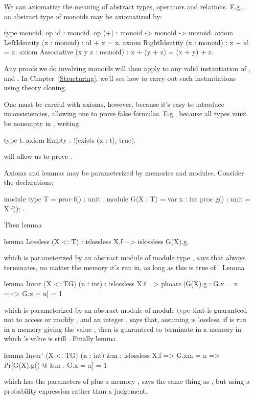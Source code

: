 We can axiomatize the meaning of abstract types, operators and relations.
E.g., an abstract type of monoids may be axiomatized by:
\begin{easycrypt}{}{}
type monoid.
op id : monoid.
op (+) : monoid -> monoid -> monoid.
axiom LeftIdentity (x : monoid) : id + x = x.
axiom RightIdentity (x : monoid) : x + id = x.
axiom Associative (x y z : monoid) : x + (y + z) = (x + y) + z.
\end{easycrypt}
Any proofs we do involving monoids will then apply to any valid
instantiation of ,  and \ec{(+)}. In
Chapter~\ref{Structuring}, we'll see how to carry out such instantiations
using theory cloning.

One must be careful with axioms, however, because it's easy to introduce
inconsistencies, allowing one to prove false formulas. E.g., because
all types must be nonempty in \EasyCrypt, writing
\begin{easycrypt}{}{}
type t.
axiom Empty : !(exists (x : t), true).
\end{easycrypt}
will allow us to prove .

Axioms and lemmas may be parameterized by
memories and modules. Consider the declarations:
\begin{easycrypt}{}{}
module type T = {
  proc f() : unit
}.
module G(X : T) = {
  var x : int
  proc g() : unit = {
    X.f();
  }
}.
\end{easycrypt}
Then lemma 
\begin{easycrypt}{}{}
lemma Lossless (X <: T) : islossless X.f => islossless G(X).g.
\end{easycrypt}
which is parameterized by an abstract module  of module type
, says that  always terminates, no matter the memory
it's run in, as long as this is true of .
Lemma 
\begin{easycrypt}{}{}
lemma Invar (X <: T{G}) (n : int) :
  islossless X.f =>
  phoare [G(X).g : G.x = n ==> G.x = n] = 1%
\end{easycrypt}
which is parameterized by an abstract module  of module type
 that is guaranteed not to access or modify , and an
integer , says that, assuming  is lossless, if
 is run in a memory giving  the value ,
then  is guaranteed to terminate in a memory in which
's value is still .  Finally lemma 
\begin{easycrypt}{}{}
lemma Invar' (X <: T{G}) (n : int) &m :
  islossless X.f => G.x{m} = n =>
  Pr[G(X).g() @ &m : G.x = n] = 1%
\end{easycrypt}
which has the parameters of  plus a memory ,
says the same thing as , but using a probability
expression rather than a \phl judgement.
